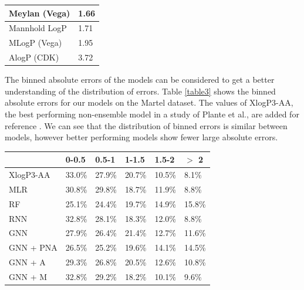 \documentclass{article}
\begin{document}
\begin{center}
\begin{tabular}{ | m{5cm} | m{2.5cm}| }
  \hline
  Meylan (Vega) & 1.66 \\
  \hline
  Mannhold LogP & 1.71 \\
  \hline
  MLogP (Vega) & 1.95 \\
  \hline
  AlogP (CDK) & 3.72 \\
  \hline
\end{tabular}
\captionsetup{width=0.8\textwidth}
\label{table2}
\end{center}

The binned absolute errors of the models can be considered to get a better understanding of the distribution of errors. Table \ref{table3} shows the binned absolute errors for our models on the Martel dataset. The values of XlogP3-AA, the best performing non-ensemble model in a study of Plante et al., are added for reference \cite{plante2018jplogp}. We can see that the distribution of binned errors is similar between models, however better performing models show fewer large absolute errors.\\

\begin{center}
\begin{tabular}{ | m{2.0cm} | m{1.0cm}| m{1.0cm}| m{1.0cm}| m{1.0cm}| m{1.0cm}| } 
  \hline
   & 0-0.5 & 0.5-1 & 1-1.5 & 1.5-2 & $>$ 2  \\ 
   \hline
   XlogP3-AA & 33.0\% & 27.9\% & 20.7\% & 10.5\% & 8.1\%  \\
  \hline
   MLR & 30.8\% & 29.8\% & 18.7\% & 11.9\% & 8.8\%  \\ 
  \hline
  RF & 25.1\% & 24.4\% & 19.7\% & 14.9\% & 15.8\%  \\ 
  \hline
  RNN & 32.8\% & 28.1\% & 18.3\% & 12.0\% & 8.8\%  \\ 
  \hline
  GNN & 27.9\% & 26.4\% & 21.4\% & 12.7\% & 11.6\%  \\ 
  \hline
  GNN + PNA & 26.5\% & 25.2\% & 19.6\% & 14.1\% & 14.5\%  \\ 
  \hline
  GNN + A & 29.3\% & 26.8\% & 20.5\% & 12.6\% & 10.8\% \\ 
  \hline
  GNN + M & 32.8\% & 29.2\% & 18.2\% & 10.1\% & 9.6\% \\ 
  \hline

\end{tabular}
\captionsetup{width=0.8\textwidth}
\label{table3}
\end{center}
\end{document}
